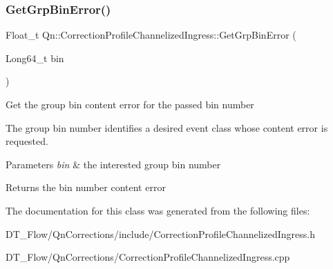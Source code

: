 \subsubsection{\texorpdfstring{Get\+Grp\+Bin\+Error()}{GetGrpBinError()}}
{\footnotesize\ttfamily Float\+\_\+t Qn\+::\+Correction\+Profile\+Channelized\+Ingress\+::\+Get\+Grp\+Bin\+Error (\begin{DoxyParamCaption}\item[{Long64\+\_\+t}]{bin }\end{DoxyParamCaption})\hspace{0.3cm}{\ttfamily [virtual]}}

Get the group bin content error for the passed bin number

The group bin number identifies a desired event class whose content error is requested.


\begin{DoxyParams}{Parameters}
{\em bin} & the interested group bin number \\
\hline
\end{DoxyParams}
\begin{DoxyReturn}{Returns}
the bin number content error 
\end{DoxyReturn}


The documentation for this class was generated from the following files\+:\begin{DoxyCompactItemize}
\item 
D\+T\+\_\+\+Flow/\+Qn\+Corrections/include/Correction\+Profile\+Channelized\+Ingress.\+h\item 
D\+T\+\_\+\+Flow/\+Qn\+Corrections/Correction\+Profile\+Channelized\+Ingress.\+cpp\end{DoxyCompactItemize}
